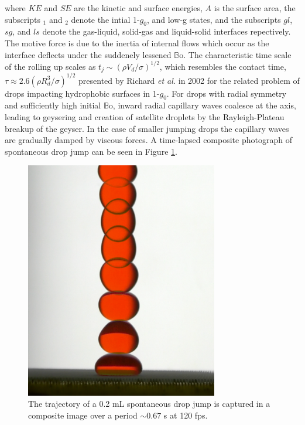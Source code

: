 \documentclass[12pt,a4paper,oneside]{book}
\begin{document}
where $KE$ and $SE$ are the kinetic and surface energies, $A$ is the surface area, the subscripts $_1$ and $_2$ denote the intial 1-$g_0$, and low-g states, and the subscripts ${gl}$, ${sg}$, and ${ls}$ denote the gas-liquid, solid-gas and liquid-solid interfaces repectively. The motive force is due to the inertia of internal flows which occur as the interface deflects under the suddenely lessened $\mathbb{B}\mbox{o}$. The characteristic time scale of the rolling up scales as $t_j \sim (\rho V_d/\sigma)^{1/2}$\cite{attari_puddle_2016}, which resembles the contact time, $\tau \approx 2.6(\rho R^3_d/\sigma)^{1/2}$ presented by Richard \emph{et al.} in 2002 for the related problem of drops impacting hydrophobic surfaces in 1-$g_0$\cite{richard_surface_2002}. For drops with radial symmetry and sufficiently high initial $\mathbb{B}\mbox{o}$, inward radial capillary waves coalesce at the axis, leading to geysering and creation of satellite droplets by the Rayleigh-Plateau breakup of the geyser. In the case of smaller jumping drops the capillary waves are gradually damped by viscous forces. A time-lapsed composite photograph of spontaneous drop jump can be seen in Figure \ref{fig:nobounce}.
\begin{figure}[htb]
\centering
\includegraphics[width=0.75\textwidth]{drop_jump}
\caption{The trajectory of a 0.2 mL spontaneous drop jump is captured in a composite image over a period $\sim 0.67$ s at 120 fps. \label{fig:nobounce}}
\end{figure}
\end{document}
